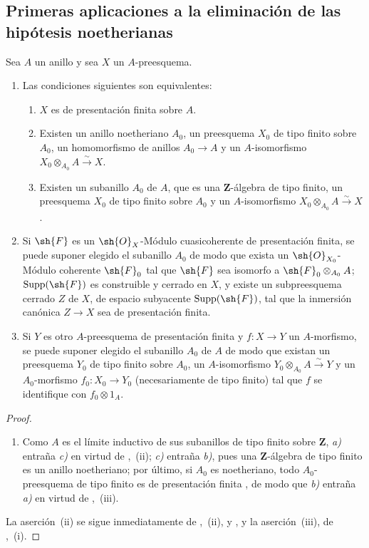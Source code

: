 \subsection{Primeras aplicaciones a la eliminación de las hipótesis noetherianas}
\label{subsection:IV.8.9}

\begin{proposition}[8.9.1]
\label{IV.8.9.1}
Sea $A$ un anillo y sea $X$ un $A$-preesquema.
\begin{enumerate}[label=(\roman*)]
\item Las condiciones siguientes son equivalentes:
\begin{enumerate}[label=\emph{\alph*)}]
\item $X$ es de presentación finita sobre $A$.
\item Existen un anillo noetheriano $A_0$, un preesquema $X_0$ de tipo finito sobre $A_0$, un homomorfismo de anillos $A_0\to A$ y un $A$-isomorfismo $X_0\otimes_{A_0}A\xrightarrow{\sim}X$.
\item Existen un subanillo $A_0$ de $A$, que es una $\mathbf{Z}$-álgebra de tipo finito, un preesquema $X_0$ de tipo finito sobre $A_0$ y un $A$-isomorfismo $X_0\otimes_{A_0}A\xrightarrow{\sim}X$.
\end{enumerate}
\item Si $\sh{F}$ es un $\sh{O}_X$-Módulo cuasicoherente de presentación finita, se puede suponer elegido el subanillo $A_0$ de modo que exista un $\sh{O}_{X_0}$-Módulo coherente $\sh{F}_0$ tal que $\sh{F}$ sea isomorfo a $\sh{F}_0\otimes_{A_0}A$; $\operatorname{Supp}(\sh{F})$ es construible y cerrado en $X$, y existe un subpreesquema cerrado $Z$ de $X$, de espacio subyacente $\operatorname{Supp}(\sh{F})$, tal que la inmersión canónica $Z\to X$ sea de presentación finita.
\item Si $Y$ es otro $A$-preesquema de presentación finita y $f:X\to Y$ un $A$-morfismo, se puede suponer elegido el subanillo $A_0$ de $A$ de modo que existan un preesquema $Y_0$ de tipo finito sobre $A_0$, un $A$-isomorfismo $Y_0\otimes_{A_0}A\xrightarrow{\sim}Y$ y un $A_0$-morfismo $f_0:X_0\to Y_0$ (necesariamente de tipo finito) tal que $f$ se identifique con $f_0\otimes 1_A$.
\end{enumerate}
\end{proposition}

\begin{proof}
\begin{enumerate}[label=(\roman*)]
\item Como $A$ es el límite inductivo de sus subanillos de tipo finito sobre $\mathbf{Z}$, \emph{a)} entraña \emph{c)} en virtud de ,~(ii); \emph{c)} entraña \emph{b)}, pues una $\mathbf{Z}$-álgebra de tipo finito es un anillo noetheriano; por último, si $A_0$ es noetheriano, todo $A_0$-preesquema de tipo finito es de presentación finita , de modo que \emph{b)} entraña \emph{a)} en virtud de ,~(iii).
\end{enumerate}
La aserción~(ii) se sigue inmediatamente de ,~(ii),  y , y la aserción~(iii), de ,~(i).
\end{proof}

